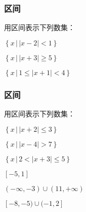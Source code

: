 \documentclass[14pt,notheorems,leqno,xcolor={rgb}]{beamer} %
\begin{document}

\begin{frame}
\frametitle{区间}
\begin{example}
用区间表示下列数集：
\begin{enumlite}
  \item $\left\{x \,\big|\, |x-2|<1\right\}$
  \item $\left\{x \,\big|\, |x+3|\ge5\right\}$
  \item $\left\{x \,\big|\, 1\le|x+1|<4\right\}$
\end{enumlite}
\end{example}
\end{frame}

\begin{oframe}
\frametitle{区间}
\begin{exercise}
用区间表示下列数集：
\begin{enumlite}
  \item $\left\{x \,\big|\, |x+2|\le3\right\}$
  \item $\left\{x \,\big|\, |x-4|>7\right\}$
  \item $\left\{x \,\big|\, 2<|x+3|\le5\right\}$
\end{enumlite}
\end{exercise}
\vpause
\begin{solution}
\begin{enumlite}
  \item $[-5,1]$
  \item $(-\infty,-3)\cup(11,+\infty)$
  \item $[-8,-5)\cup(-1,2]$
\end{enumlite} 
\end{solution}
\end{oframe}
\end{document}
